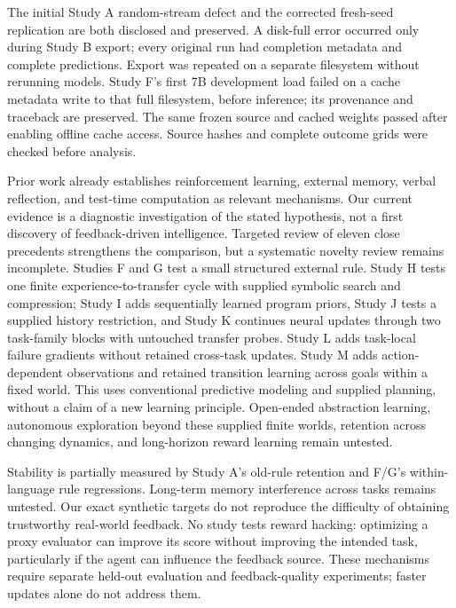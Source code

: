 \documentclass[11pt]{article}
\begin{document}
The initial Study A random-stream defect and the corrected fresh-seed
replication are both disclosed and preserved. A disk-full error occurred only
during Study B export; every original run had completion metadata and complete
predictions. Export was repeated on a separate filesystem without rerunning
models. Study F's first 7B development load failed on a cache metadata write
to that full filesystem, before inference; its provenance and traceback are
preserved. The same frozen source and cached weights passed after enabling
offline cache access. Source hashes and complete outcome grids were checked
before analysis.

Prior work already establishes reinforcement learning, external memory,
verbal reflection, and test-time computation as relevant mechanisms. Our
current evidence is a diagnostic investigation of the stated hypothesis, not
a first discovery of feedback-driven intelligence. Targeted review of eleven
close precedents strengthens the comparison, but a systematic novelty review
remains incomplete. Studies F and G test a small structured external rule.
Study H tests one finite experience-to-transfer cycle with supplied symbolic
search and compression; Study I adds sequentially learned program priors,
Study J tests a supplied history restriction, and Study K continues neural
updates through two task-family blocks with untouched transfer probes.
Study L adds task-local failure gradients without retained cross-task updates.
Study M adds action-dependent observations and retained transition learning
across goals within a fixed world. This uses conventional predictive modeling
and supplied planning, without a claim of a new learning principle.
Open-ended abstraction learning, autonomous exploration beyond these supplied
finite worlds, retention across changing dynamics, and long-horizon reward
learning remain untested.

Stability is partially measured by Study A's old-rule retention and F/G's
within-language rule regressions. Long-term memory interference across tasks
remains untested. Our exact
synthetic targets do not reproduce the difficulty of obtaining trustworthy
real-world feedback. No study tests reward hacking: optimizing a proxy evaluator
can improve its score without improving the intended task, particularly if the
agent can influence the feedback source. These mechanisms require separate
held-out evaluation and feedback-quality experiments; faster updates alone do
not address them.
\end{document}
